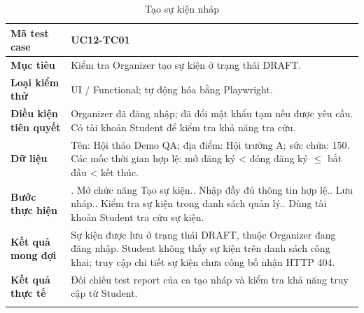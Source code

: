 \begin{table}[H]
\centering
\begingroup\small
\renewcommand{\arraystretch}{1.18}
\caption{Tạo sự kiện nháp}\label{tab:i1-detail-3}
\begin{tabularx}{\linewidth}{@{}p{.23\linewidth}>{\raggedright\arraybackslash}X@{}}
\toprule
\textbf{Mã test case} & \textbf{UC12-TC01} \\\midrule
\textbf{Mục tiêu} & Kiểm tra Organizer tạo sự kiện ở trạng thái DRAFT. \\ \addlinespace[3pt]
\textbf{Loại kiểm thử} & UI / Functional; tự động hóa bằng Playwright. \\ \addlinespace[3pt]
\textbf{Điều kiện tiên quyết} & Organizer đã đăng nhập; đã đổi mật khẩu tạm nếu được yêu cầu. Có tài khoản Student để kiểm tra khả năng tra cứu. \\ \addlinespace[3pt]
\textbf{Dữ liệu} & Tên: Hội thảo Demo QA; địa điểm: Hội trường A; sức chứa: 150. Các mốc thời gian hợp lệ: mở đăng ký < đóng đăng ký $\leq$ bắt đầu < kết thúc. \\ \addlinespace[3pt]
\textbf{Bước thực hiện} & 1. Mở chức năng Tạo sự kiện.\newline 2. Nhập đầy đủ thông tin hợp lệ.\newline 3. Lưu nháp.\newline 4. Kiểm tra sự kiện trong danh sách quản lý.\newline 5. Dùng tài khoản Student tra cứu sự kiện. \\ \addlinespace[3pt]
\textbf{Kết quả mong đợi} & Sự kiện được lưu ở trạng thái DRAFT, thuộc Organizer đang đăng nhập. Student không thấy sự kiện trên danh sách công khai; truy cập chi tiết sự kiện chưa công bố nhận HTTP 404. \\ \addlinespace[3pt]
\textbf{Kết quả thực tế} & Đối chiếu test report của ca tạo nháp và kiểm tra khả năng truy cập từ Student. \\ \addlinespace[3pt]
\bottomrule
\end{tabularx}
\endgroup
\end{table}

